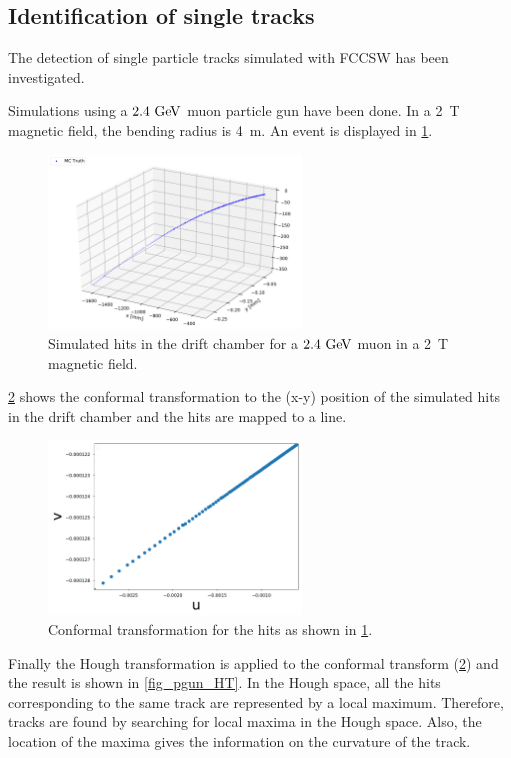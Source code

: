 \subsection{Identification of single tracks}
The detection of single particle tracks simulated with FCCSW has been investigated.

Simulations using a $2.4\,\mathrm{\,Ge\kern -0.1em V}$ muon particle gun have been done. In a 2~T magnetic field, the bending radius is 4~m. An event is displayed in \cref{fig_pgun_3d}.

\begin{figure}[ht]
	\centering
	\includegraphics[width=0.6\textwidth]{figures/3D_pgun.pdf}%
	\caption{Simulated hits in the drift chamber for a $2.4\,\mathrm{\,Ge\kern -0.1em V}$ muon in a 2~T magnetic field.}
	\label{fig_pgun_3d}
\end{figure}

\cref{fig_pgun_CT} shows the conformal transformation to the (x-y) position of the simulated hits in the drift chamber and the hits are mapped to a line.

\begin{figure}[ht]
	\centering
	\includegraphics[width=0.6\textwidth]{figures/CT_pgun.pdf}%
	\caption{Conformal transformation for the hits as shown in \cref{fig_pgun_3d}.}
	\label{fig_pgun_CT}
\end{figure}

Finally the Hough transformation is applied to the conformal transform (\cref{fig_pgun_CT}) and the result is shown in \cref{fig_pgun_HT}. In the Hough space, all the hits corresponding to the same track are represented by a local maximum. Therefore, tracks are found by searching for local maxima in the Hough space. Also, the location of the maxima gives the information on the curvature of the track.

